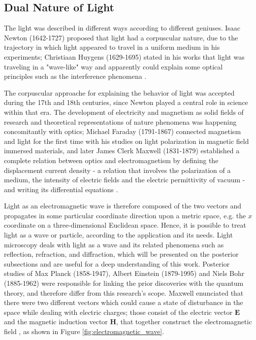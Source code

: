 \subsection{Dual Nature of Light}

The light was described in different ways according to different geniuses. Isaac Newton (1642-1727) proposed that light had a corpuscular nature, due to the trajectory in which light appeared to travel in a uniform medium in his experiments; Christiaan Huygens (1629-1695) stated in his works that light was traveling in a "wave-like" way and apparently could explain some optical principles such as the interference phenomena \cite{fowles1989introduction}. 

The corpuscular approache for explaining the behavior of light was accepted during the 17th and 18th centuries, since Newton played a central role in science within that era. The development of electricity and magnetism as solid fields of research and theoretical representations of nature phenomena was happening concomitantly with optics; Michael Faraday (1791-1867) connected magnetism and light for the first time with his studies on light polarization in magnetic field immersed materials, and later James Clerk Maxwell (1831-1879) established a complete relation between optics and electromagnetism by defining the displacement current density - a relation that involves the polarization of a medium, the intensity of electric fields and the electric permittivity of vacuum - and writing its differential equations \cite{zilio2009optica}.

Light as an electromagnetic wave is therefore composed of the two vectors and propagates in some particular coordinate direction upon a metric space, e.g. the $\mathit{x}$ coordinate on a three-dimensional Euclidean space. Hence, it is possible to treat light as a wave or particle, according to the application and its needs. Light microscopy deals with light as a wave and its related phenomena such as reflection, refraction, and diffraction, which will be presented on the posterior subsections and are useful for a deep understanding of this work. Posterior studies of Max Planck (1858-1947), Albert Einstein (1879-1995) and Niels Bohr (1885-1962) \cite{fowles1989introduction} were responsible for linking the prior discoveries with the quantum theory, and therefore differ from this research's scope. Maxwell enunciated that there were two different vectors which could cause a state of disturbance in the space while dealing with electric charges; those consist of the electric vector $\mathit{\mathbf{E}}$ and the magnetic induction vector $\mathit{\mathbf{H}}$, that together construct the electromagnetic field \cite{born1999principles}, as shown in Figure \ref{fig:electromagnetic_wave}.

